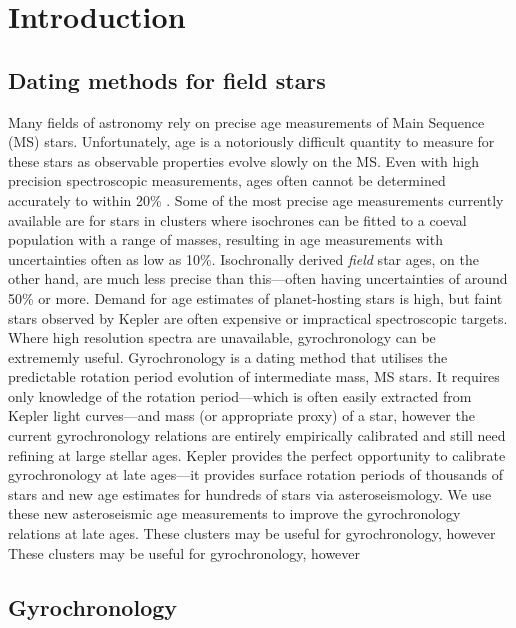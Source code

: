 \documentclass[10pt,preprint]{aastex}
\begin{document}
\section{Introduction}
\label{intro}
\subsection{Dating methods for field stars}

Many fields of astronomy rely on precise age measurements of Main Sequence (MS) stars.
Unfortunately, age is a notoriously difficult quantity to measure for these stars as observable properties evolve slowly on the MS.
Even with high precision spectroscopic measurements, ages often cannot be determined accurately to within 20\% \citep{Soderblom2010}.
Some of the most precise age measurements currently available are for stars in clusters where isochrones can be fitted to a coeval population with a range of masses, resulting in age measurements with uncertainties often as low as 10\%.
Isochronally derived {\it field} star ages, on the other hand, are much less precise than this---often having uncertainties of around 50\% or more.
Demand for age estimates of planet-hosting stars is high, but faint stars observed by Kepler are often expensive or impractical spectroscopic targets.
Where high resolution spectra are unavailable, gyrochronology can be extrememly useful.
Gyrochronology is a dating method that utilises the predictable rotation period evolution of intermediate mass, MS stars.
It requires only knowledge of the rotation period---which is often easily extracted from Kepler light curves---and mass (or appropriate proxy) of a star, however the current gyrochronology relations are entirely empirically calibrated and still need refining at large stellar ages.
Kepler provides the perfect opportunity to calibrate gyrochronology at late ages---it provides surface rotation periods of thousands of stars and new age estimates for hundreds of stars via asteroseismology.
We use these new asteroseismic age measurements to improve the gyrochronology relations at late ages.
These clusters may be useful for gyrochronology, however
These clusters may be useful for gyrochronology, however

\subsection{Gyrochronology}
\end{document}
